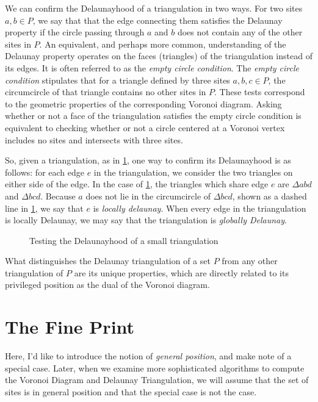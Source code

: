 \documentclass[12pt,twoside]{reedthesis}
\begin{document}
    We can confirm the Delaunayhood of a triangulation in two ways. For two sites $a, b \in P$, we say that that the edge connecting them satisfies the Delaunay property if the circle passing through $a$ and $b$ does not contain any of the other sites in $P$. An equivalent, and perhaps more common, understanding of the Delaunay property operates on the faces (triangles) of the triangulation instead of its edges. It is often referred to as the \emph{empty circle condition}. The \emph{empty circle condition} stipulates that for a triangle defined by three sites $a, b, c \in P$, the circumcircle of that triangle contains no other sites in $P$. These tests correspond to the geometric properties of the corresponding Voronoi diagram. Asking whether or not a face of the triangulation satisfies the empty circle condition is equivalent to checking whether or not a circle centered at a Voronoi vertex includes no sites and intersects with three sites.\par

    So, given a triangulation, as in \cref{fig:delaunayhood_small}, one way to confirm its Delaunayhood is as follows: for each edge $e$ in the triangulation, we consider the two triangles on either side of the edge.  In the case of \cref{fig:delaunayhood_small}, the triangles which share edge $e$ are $\Delta abd$ and $\Delta bcd$. Because $a$ does not lie in the circumcircle of $\Delta bcd$, shown as a dashed line in \cref{fig:delaunayhood_small}, we say that $e$ is \emph{locally delaunay}. When every edge in the triangulation is locally Delaunay, we may say that the triangulation is \emph{globally Delaunay}.

    \begin{figure}[!htb]
      \centering
      
      \caption{Testing the Delaunayhood of a small triangulation}
      \label{fig:delaunayhood_small}
    \end{figure}

    What distinguishes the Delaunay triangulation of a set $P$ from any other triangulation of $P$ are its unique properties, which are directly related to its privileged position as the dual of the Voronoi diagram. 


  \section{The Fine Print}
  \label{sec:the_fine_print}
    Here, I'd like to introduce the notion of \emph{general position}, and make note of a special case. Later, when we examine more sophisticated algorithms to compute the Voronoi Diagram and Delaunay Triangulation, we will assume that the set of sites is in general position and that the special case is not the case.
\end{document}
